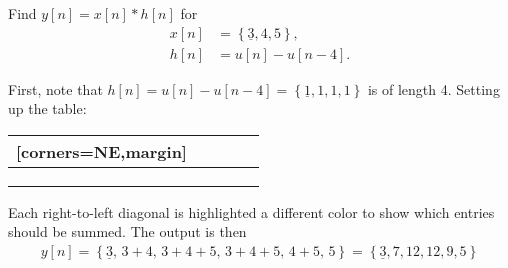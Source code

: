 \documentclass{report}
\begin{document}
\begin{example}
    Find $y[n]=x[n]*h[n]$ for 
    \begin{align*}
        x[n] &= \left\{\underline{3},4,5\right\}, \\
        h[n] &= u[n]-u[n-4].
    \end{align*}
\end{example}
\begin{solution}
    First, note that $h[n] = u[n]-u[n-4] = \left\{\underline{1},1,1,1\right\}$ is of length 4. Setting up the table:
    \begin{center}
        \begin{NiceTabular}{p{1cm}|p{1cm} p{1cm} p{1cm} p{1cm}}[corners=NE,margin]
            \rule{0pt}{2em} &  &  &  &  \\
            \hline
             &  &  &  &  \\
             &  &  &  &  \\
             &  &  &  & 
        \end{NiceTabular}
    \end{center}
    Each right-to-left diagonal is highlighted a different color to show which entries should be summed. The output is then 
    \begin{align*}
        y[n] = \left\{\underline{3},\,3+4,\,3+4+5,\,3+4+5,\,4+5,\,5\right\} = \left\{\underline{3},7,12,12,9,5\right\}
    \end{align*}
\end{solution}
\end{document}
